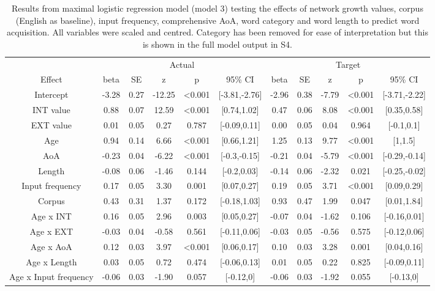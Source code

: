 \documentclass[
  man]{apa6}
\begin{document}
\begin{longtable}[t]{ccccccccccc}
\caption{\label{tab:table-data-summary}Results from maximal logistic regression model (model 3) testing the effects of network growth values, corpus (English as baseline), input frequency, comprehensive AoA, word category and word length to predict word acquisition. All variables were scaled and centred. Category has been removed for ease of interpretation but this is shown in the full model output in S4.}\\
\toprule
\multicolumn{1}{c}{ } & \multicolumn{5}{c}{Actual} & \multicolumn{5}{c}{Target} \\
\cmidrule(l{3pt}r{3pt}){2-6} \cmidrule(l{3pt}r{3pt}){7-11}
Effect & beta & SE & z & p & 95\% CI & beta & SE & z & p & 95\% CI\\
\midrule
Intercept & -3.28 & 0.27 & -12.25 & <0.001 & {}[-3.81,-2.76] & -2.96 & 0.38 & -7.79 & <0.001 & {}[-3.71,-2.22]\\
INT value & 0.88 & 0.07 & 12.59 & <0.001 & {}[0.74,1.02] & 0.47 & 0.06 & 8.08 & <0.001 & {}[0.35,0.58]\\
EXT value & 0.01 & 0.05 & 0.27 & 0.787 & {}[-0.09,0.11] & 0.00 & 0.05 & 0.04 & 0.964 & {}[-0.1,0.1]\\
Age & 0.94 & 0.14 & 6.66 & <0.001 & {}[0.66,1.21] & 1.25 & 0.13 & 9.77 & <0.001 & {}[1,1.5]\\
AoA & -0.23 & 0.04 & -6.22 & <0.001 & {}[-0.3,-0.15] & -0.21 & 0.04 & -5.79 & <0.001 & {}[-0.29,-0.14]\\
\addlinespace
Length & -0.08 & 0.06 & -1.46 & 0.144 & {}[-0.2,0.03] & -0.14 & 0.06 & -2.32 & 0.021 & {}[-0.25,-0.02]\\
Input frequency & 0.17 & 0.05 & 3.30 & 0.001 & {}[0.07,0.27] & 0.19 & 0.05 & 3.71 & <0.001 & {}[0.09,0.29]\\
Corpus & 0.43 & 0.31 & 1.37 & 0.172 & {}[-0.18,1.03] & 0.93 & 0.47 & 1.99 & 0.047 & {}[0.01,1.84]\\
Age x INT & 0.16 & 0.05 & 2.96 & 0.003 & {}[0.05,0.27] & -0.07 & 0.04 & -1.62 & 0.106 & {}[-0.16,0.01]\\
Age x EXT & -0.03 & 0.04 & -0.58 & 0.561 & {}[-0.11,0.06] & -0.03 & 0.05 & -0.56 & 0.575 & {}[-0.12,0.06]\\
\addlinespace
Age x AoA & 0.12 & 0.03 & 3.97 & <0.001 & {}[0.06,0.17] & 0.10 & 0.03 & 3.28 & 0.001 & {}[0.04,0.16]\\
Age x Length & 0.03 & 0.05 & 0.72 & 0.474 & {}[-0.06,0.13] & 0.01 & 0.05 & 0.22 & 0.825 & {}[-0.09,0.11]\\
Age x Input frequency & -0.06 & 0.03 & -1.90 & 0.057 & {}[-0.12,0] & -0.06 & 0.03 & -1.92 & 0.055 & {}[-0.13,0]\\
\bottomrule
\end{longtable}
\endgroup{}
\end{document}
